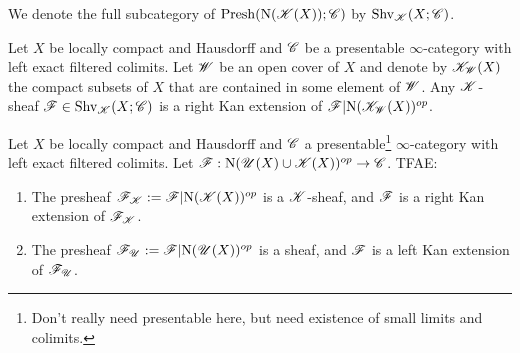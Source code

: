 \documentclass[../thesis.tex]{subfiles}
\begin{document}
\begin{definition}
    We denote the full subcategory of $\mathrm{Presh}(\mathrm{N}(\mathscr{K}(X)); \mathscr{C})$ by $\mathrm{Shv}_{\mathscr{K}}(X;\mathscr{C})$.
\end{definition}
\begin{lemma}\label{7.3.4.8}
    Let $X$ be locally compact and Hausdorff and $\mathscr{C}$ be a presentable $\infty$-category with left exact filtered colimits.
    Let $\mathscr{W}$ be an open cover of $X$ and denote by $\mathscr{K}_{\mathscr{W}}(X)$ the compact subsets of $X$ that are contained in some element of $\mathscr{W}$.
    Any $\mathscr{K}$-sheaf $\mathscr{F}\in \mathrm{Shv}_{\mathscr{K}}(X;\mathscr{C})$ is a right Kan extension of $\mathscr{F}|\mathrm{N}(\mathscr{K}_{\mathscr{W}}(X))^{op}$.
\end{lemma}
\begin{theorem}\label{7.3.4.9}
    Let $X$ be locally compact and Hausdorff and $\mathscr{C}$ a presentable\footnote{Don't really need presentable here, but need existence of small limits and colimits.} $\infty$-category with left exact filtered colimits.
    Let $\mathscr{F} : \mathrm{N}(\mathscr{U}(X) \cup \mathscr{K}(X))^{op} \to \mathscr{C}$. TFAE:
    \begin{enumerate}[]
        \item The presheaf $\mathscr{F}_{\mathscr{K}}:= \mathscr{F}|\mathrm{N}(\mathscr{K}(X))^{op}$ is a $\mathscr{K}$-sheaf, and $\mathscr{F}$ is a right Kan extension of $\mathscr{F}_{\mathscr{K}}$.
        \item The presheaf $\mathscr{F}_{\mathscr{U}}:=\mathscr{F}|\mathrm{N}(\mathscr{U}(X))^{op}$ is a sheaf, and $\mathscr{F}$ is a left Kan extension of $\mathscr{F}_{\mathscr{U}}$.
    \end{enumerate}
\end{theorem}
\end{document}
